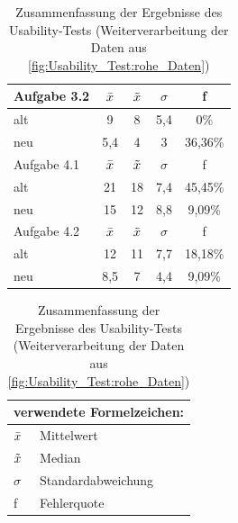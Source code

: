 \begin{table}[H]
\begin{tabular}{|l|c|c|c|c|}
\hline
Aufgabe 3.2   & $\Bar{x}$ & $\Tilde{x}$ & $\sigma$ & f \\ \hline
alt           & 9         &  8          &  5,4  &  0\%   \\ \hline
neu           & 5,4       &  4          &  3    &  36,36\%   \\ \hline
\hline
Aufgabe 4.1   & $\Bar{x}$ & $\Tilde{x}$ & $\sigma$ & f \\ \hline
alt           & 21        &  18         &  7,4  &  45,45\%   \\ \hline
neu           & 15        &  12         &  8,8  &  9,09\%   \\ \hline
\hline
Aufgabe 4.2   & $\Bar{x}$ & $\Tilde{x}$ & $\sigma$ & f \\ \hline
alt           & 12        &  11         &  7,7  &  18,18\%   \\ \hline
neu           & 8,5       &  7          &  4,4  &  9,09\%   \\ \hline
\end{tabular}

\begin{tabular}{ll}
\multicolumn{2}{l}{verwendete Formelzeichen:} \\ \hline
$\Bar{x}$          & Mittelwert               \\
$\Tilde{x}$        & Median                   \\
$\sigma$           & Standardabweichung       \\
f                  & Fehlerquote
\end{tabular}
\caption{Zusammenfassung der Ergebnisse des Usability-Tests (Weiterverarbeitung der Daten aus \autoref{fig:Usability_Test:rohe_Daten})}
\label{tab:usability_test:mittelwerte}
\end{table}


